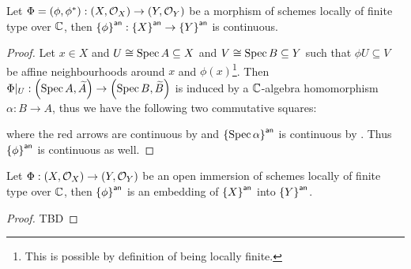 \begin{lemma}
  Let $\Phi = (\phi, \phi^{*}) : \left(X, \mathcal{O}_{X}\right) \to \left(Y, \mathcal{O}_{Y}\right)$ be a morphism of schemes locally of finite type over $\mathbb{C}$, then ${\left\{{\phi}\right\}}^{\mathsf{an}} : {\left\{{X}\right\}}^{\mathsf{an}} \to {\left\{{Y}\right\}}^{\mathsf{an}}$ is continuous.
\end{lemma}
\begin{proof}
  Let $x \in X$ and $U \cong \operatorname{Spec} A \subseteq X$ and $V \cong \operatorname{Spec} B \subseteq Y$ such that $\phi U \subseteq V$ be affine neighbourhoods around $x$ and $\phi(x)$\footnote{This is possible by definition of being locally finite.}. Then $\Phi|_{U} : \left(\operatorname*{Spec}{A}, \widetilde{A}\right) \to \left(\operatorname*{Spec}{B}, \widetilde{B}\right)$ is induced by a $\mathbb{C}$-algebra homomorphism $\alpha: B \to A$, thus we have the following two commutative squares:
  \begin{center}
  \end{center}
  where the red arrows are continuous by  and ${\left\{{\operatorname{Spec}\alpha}\right\}}^{\mathsf{an}}$ is continuous by . Thus ${\left\{{\phi}\right\}}^{\mathsf{an}}$ is continuous as well.
\end{proof}

\begin{corollary}
  Let $\Phi : \left(X, \mathcal{O}_{X}\right) \to \left(Y, \mathcal{O}_{Y}\right)$ be an open immersion of schemes locally of finite type over $\mathbb{C}$, then ${\left\{{\phi}\right\}}^{\mathsf{an}}$ is an embedding of ${\left\{{X}\right\}}^{\mathsf{an}}$ into ${\left\{{Y}\right\}}^{\mathsf{an}}$.
\end{corollary}
\begin{proof}
  TBD
\end{proof}
